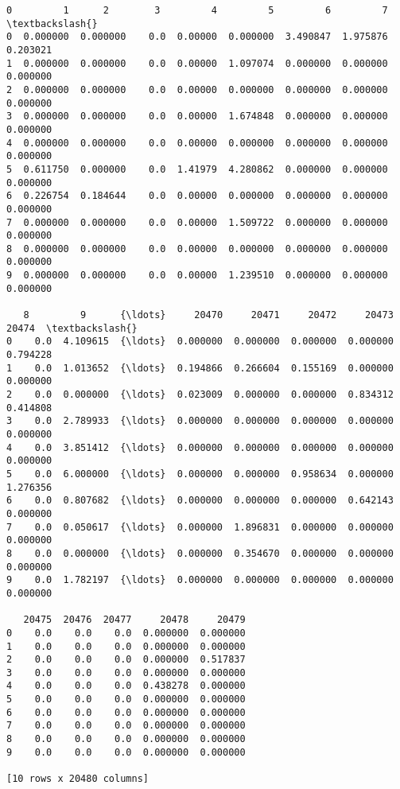 \documentclass[11pt]{article}
\makeatletter
\newcommand{\boxspacing}{\kern\kvtcb@left@rule\kern\kvtcb@boxsep}
\newcommand{\prompt}[4]{
        {\ttfamily\llap{{\color{#2}[#3]:\hspace{3pt}#4}}\vspace{-\baselineskip}}
    }
\makeatother
\begin{document}
            \begin{tcolorbox}[breakable, size=fbox, boxrule=.5pt, pad at break*=1mm, opacityfill=0]
\prompt{Out}{outcolor}{10}{\boxspacing}
\begin{Verbatim}[commandchars=\\\{\}]
      0         1      2        3         4         5         6         7      \textbackslash{}
0  0.000000  0.000000    0.0  0.00000  0.000000  3.490847  1.975876  0.203021
1  0.000000  0.000000    0.0  0.00000  1.097074  0.000000  0.000000  0.000000
2  0.000000  0.000000    0.0  0.00000  0.000000  0.000000  0.000000  0.000000
3  0.000000  0.000000    0.0  0.00000  1.674848  0.000000  0.000000  0.000000
4  0.000000  0.000000    0.0  0.00000  0.000000  0.000000  0.000000  0.000000
5  0.611750  0.000000    0.0  1.41979  4.280862  0.000000  0.000000  0.000000
6  0.226754  0.184644    0.0  0.00000  0.000000  0.000000  0.000000  0.000000
7  0.000000  0.000000    0.0  0.00000  1.509722  0.000000  0.000000  0.000000
8  0.000000  0.000000    0.0  0.00000  0.000000  0.000000  0.000000  0.000000
9  0.000000  0.000000    0.0  0.00000  1.239510  0.000000  0.000000  0.000000

   8         9      {\ldots}     20470     20471     20472     20473     20474  \textbackslash{}
0    0.0  4.109615  {\ldots}  0.000000  0.000000  0.000000  0.000000  0.794228
1    0.0  1.013652  {\ldots}  0.194866  0.266604  0.155169  0.000000  0.000000
2    0.0  0.000000  {\ldots}  0.023009  0.000000  0.000000  0.834312  0.414808
3    0.0  2.789933  {\ldots}  0.000000  0.000000  0.000000  0.000000  0.000000
4    0.0  3.851412  {\ldots}  0.000000  0.000000  0.000000  0.000000  0.000000
5    0.0  6.000000  {\ldots}  0.000000  0.000000  0.958634  0.000000  1.276356
6    0.0  0.807682  {\ldots}  0.000000  0.000000  0.000000  0.642143  0.000000
7    0.0  0.050617  {\ldots}  0.000000  1.896831  0.000000  0.000000  0.000000
8    0.0  0.000000  {\ldots}  0.000000  0.354670  0.000000  0.000000  0.000000
9    0.0  1.782197  {\ldots}  0.000000  0.000000  0.000000  0.000000  0.000000

   20475  20476  20477     20478     20479
0    0.0    0.0    0.0  0.000000  0.000000
1    0.0    0.0    0.0  0.000000  0.000000
2    0.0    0.0    0.0  0.000000  0.517837
3    0.0    0.0    0.0  0.000000  0.000000
4    0.0    0.0    0.0  0.438278  0.000000
5    0.0    0.0    0.0  0.000000  0.000000
6    0.0    0.0    0.0  0.000000  0.000000
7    0.0    0.0    0.0  0.000000  0.000000
8    0.0    0.0    0.0  0.000000  0.000000
9    0.0    0.0    0.0  0.000000  0.000000

[10 rows x 20480 columns]
\end{Verbatim}
\end{tcolorbox}
        
\end{document}
